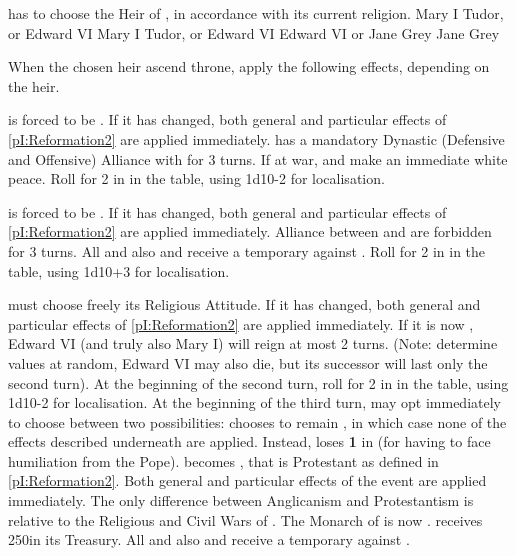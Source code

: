 \newpage\startevents






\phevnt
\aparag \ENG has to choose the Heir of , in accordance
with its current religion.
 Mary I Tudor, or Edward VI
\bparag[\CATHCR] Mary I Tudor, or Edward VI
\bparag[\CATHCO] Edward VI or Jane Grey
\bparag[\PROTPUR] Jane Grey

\aparag When the chosen heir ascend throne, apply the following effects,
depending on the heir.

 \ENG is forced to be \CATHCR.  If it has changed, both
general and particular effects of \ref{pI:Reformation2} are applied
immediately.
\bparag \ANG has a mandatory Dynastic (Defensive and Offensive) Alliance with
\SPA for 3 turns.  If at war, \SPA and \ENG make an immediate white peace.
\bparag Roll for 2 \REVOLT in \ENG in the table, using 1d10-2 for
localisation.

 \ENG is forced to be \PROTPUR.  If it has changed,
both general and particular effects of \ref{pI:Reformation2} are applied
immediately.
\bparag Alliance between \ENG and \SPA are forbidden for 3 turns.
\bparag All \CATHCR \MAJ and also \POR and \VEN receive a temporary \CB
against \ENG.
\bparag Roll for 2 \REVOLT in \ENG in the table, using 1d10+3 for
localisation.

\aparag[Edward VI] \ENG must choose freely its Religious Attitude.  If it has
changed, both general and particular effects of \ref{pI:Reformation2} are
applied immediately.  If it is now \CATHCO, Edward VI (and truly also Mary I)
will reign at most 2 turns. (Note: determine values at random, Edward VI may
also die, but its successor will last only the second turn).
\bparag At the beginning of the second turn, roll for 2 \REVOLT in \ENG in the
table, using 1d10-2 for localisation.
 At the beginning of the third
turn, \ENG may opt immediately to choose between two possibilities:
 \ENG chooses to remain \CATHCO, in which case none of the
effects described underneath are applied. Instead, \ENG loses {\bf 1} in \STAB
(for having to face humiliation from the Pope).
 \ENG becomes \PROTANG, that is Protestant as
defined in \ref{pI:Reformation2}.  Both general and particular effects of the
event are applied immediately.  The only difference between Anglicanism and
Protestantism is relative to the Religious and Civil Wars of \ENG.
\bparag The Monarch of \ENG is now .
\bparag \ENG receives 250\ducats in its Treasury.
\bparag All \CATHCR \MAJ and also \POR and \VEN receive a temporary \CB
against \ENG.

